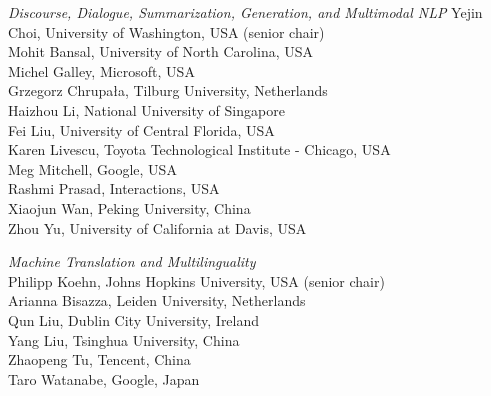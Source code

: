 \emph{Discourse, Dialogue, Summarization, Generation, and Multimodal NLP}
\hspace*{0.2in}Yejin Choi, University of Washington, USA (senior chair)\\
\hspace*{0.2in}Mohit Bansal, University of North Carolina, USA\\
\hspace*{0.2in}Michel Galley, Microsoft, USA\\
\hspace*{0.2in}Grzegorz Chrupa\l{}a, Tilburg University, Netherlands\\
\hspace*{0.2in}Haizhou Li, National University of Singapore\\
\hspace*{0.2in}Fei Liu, University of Central Florida, USA\\
\hspace*{0.2in}Karen Livescu, Toyota Technological Institute - Chicago, USA\\
\hspace*{0.2in}Meg Mitchell, Google, USA\\
\hspace*{0.2in}Rashmi Prasad, Interactions, USA\\
\hspace*{0.2in}Xiaojun Wan, Peking University, China\\
\hspace*{0.2in}Zhou Yu, University of California at Davis, USA

\emph{Machine Translation and Multilinguality} \\
\hspace*{0.2in}Philipp Koehn, Johns Hopkins University, USA (senior chair)\\
\hspace*{0.2in}Arianna Bisazza, Leiden University, Netherlands\\
\hspace*{0.2in}Qun Liu, Dublin City University, Ireland\\
\hspace*{0.2in}Yang Liu, Tsinghua University, China\\
\hspace*{0.2in}Zhaopeng Tu, Tencent, China\\
\hspace*{0.2in}Taro Watanabe, Google, Japan

